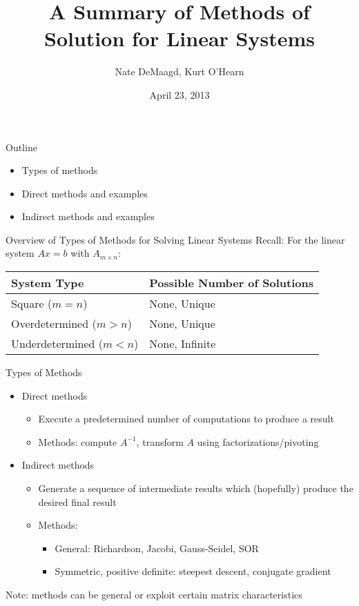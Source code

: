 \documentclass[9pt, serif]{beamer}
\title[Methods of Solution for Linear Systems]
{A Summary of Methods of Solution for Linear Systems}
\author[]
{Nate DeMaagd, Kurt O'Hearn}
\institute[Grand Valley State University]
{MTH 499-02}
\date{April 23, 2013}
\newlength{\wideitemsep}
\let\olditem\item
\renewcommand{\item}{\setlength{\itemsep}{\wideitemsep}\olditem}
\newcommand{\bi}{\begin{itemize}}
\newcommand{\ei}{\end{itemize}}
\begin{document}
\begin{frame}
    \titlepage
\end{frame}


\begin{frame}{Outline}
    \pause
    \bi
        \item Types of methods \pause
        \item Direct methods and examples \pause
        \item Indirect methods and examples
    \ei
\end{frame}


\begin{frame}{Overview of Types of Methods for Solving Linear Systems}
    \pause
    Recall: For the linear system $Ax = b$ with $A_{m\times n}$: \\
    \pause
    \begin{center}
        \begin{tabular}{l|l}
            System Type & Possible Number of Solutions \\ \hline
            Square ($m = n$) & None, Unique \\
            Overdetermined ($m > n$) & None, Unique \\
            Underdetermined ($m < n$) & None, Infinite \\
        \end{tabular}
    \end{center}
    \pause
    Types of Methods
    \bi
        \item Direct methods \pause
        \bi
            \item Execute a predetermined number of computations to produce a result \pause
            \item Methods: compute $A^{-1}$, transform $A$ using factorizations/pivoting \pause
        \ei
        \item Indirect methods \pause
        \bi
            \item Generate a sequence of intermediate results which (hopefully) produce the desired final result \pause
	        \item Methods: \pause
            \bi
                \item General: Richardson, Jacobi, Gauss-Seidel, SOR \pause
                \item Symmetric, positive definite: steepest descent, conjugate gradient \pause
            \ei
    	\ei
    \ei
    Note: methods can be general or exploit certain matrix characteristics
\end{frame}
\end{document}
